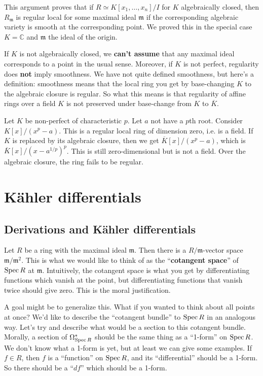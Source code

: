 \begin{remark}[Warning] This argument proves that if $R \simeq K[x_1, \dots,
x_n]/I$ for $K$ algebraically closed, then $R_{\mathfrak{m}}$ is regular local for some maximal ideal
$\mathfrak{m}$ if the corresponding algebraic variety is smooth at the
corresponding point. We proved this in the special case $K  = \mathbb{C}$ and
$\mathfrak{m}$ the ideal of the origin.

If $K$ is not algebraically closed, we \textbf{can't assume} that any maximal
ideal corresponds to a point in the usual sense. Moreover, if $K$ is not
perfect, regularity does \textbf{not} imply smoothness. We have not quite
defined smoothness, but here's a definition: smoothness means that the local
ring you get by base-changing $K$ to the algebraic closure is regular. So what
this means is that 
regularity of affine rings over a field $K$ is not preserved under
base-change from $K$ to $\overline{K}$. 
\end{remark} 

\begin{example} Let $K$ be non-perfect of characteristic $p$. Let $a$ not have
a $p$th root.
Consider $K[x]/(x^p -a)$. This is a regular local ring of dimension zero, i.e.
is a field. If $K$ is replaced by its algebraic closure, then we get
$\overline{K}[x]/(x^p - a)$, which is $\overline{K}[x]/(x- a^{1/p})^p$. This is
still zero-dimensional but is not a field. Over the algebraic closure, the ring
fails to be regular.
\end{example} 




\section{K\"ahler differentials}
\subsection{Derivations and K\"ahler differentials} Let $R$ be a ring with the maximal ideal
$\mathfrak{m}$. Then there is a $R/\mathfrak{m}$-vector space
$\mathfrak{m}/\mathfrak{m}^2$. This is what we would like to think of as the
``\textbf{cotangent space}'' of $\operatorname{Spec} R$ at $\mathfrak{m}$. Intuitively, the
cotangent space is what you get by differentiating functions which vanish at
the point, but
differentiating functions that vanish twice should give zero. This is the moral
justification.

A goal might be to generalize this. What if you wanted to think about all
points at once? We'd like to describe the ``cotangent bundle'' to $\operatorname{Spec} R$ in
an analogous way. Let's try and describe what would be a section to this
cotangent bundle. Morally, a section of $\Omega^*_{\operatorname{Spec} R}$ should be the same
thing as a ``1-form'' on $\operatorname{Spec} R$. We don't know what a 1-form is yet, but at
least we can give some examples. If $f \in R$, then $f$ is a ``function'' on
$\operatorname{Spec} R$, and its ``differential'' should be a 1-form. So there should be a
``$df$'' which should be a 1-form. 

